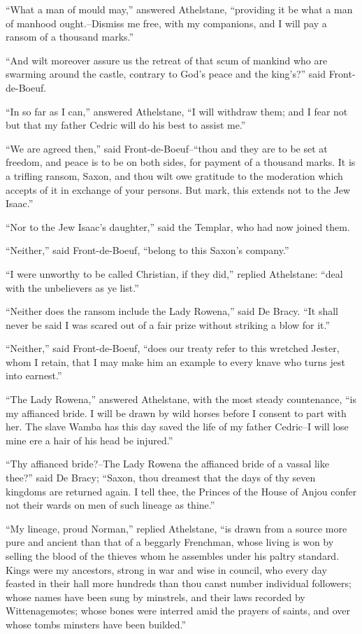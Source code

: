 ``What a man of mould may,'' answered Athelstane, ``providing it be what
a man of manhood ought.--Dismiss me free, with my companions, and I will
pay a ransom of a thousand marks.''

``And wilt moreover assure us the retreat of that scum of mankind who
are swarming around the castle, contrary to God's peace and the
king's?'' said Front-de-Boeuf.

``In so far as I can,'' answered Athelstane, ``I will withdraw them; and
I fear not but that my father Cedric will do his best to assist me.''

``We are agreed then,'' said Front-de-Boeuf--``thou and they are to be
set at freedom, and peace is to be on both sides, for payment of a
thousand marks. It is a trifling ransom, Saxon, and thou wilt owe
gratitude to the moderation which accepts of it in exchange of your
persons. But mark, this extends not to the Jew Isaac.''

``Nor to the Jew Isaac's daughter,'' said the Templar, who had now
joined them.

``Neither,'' said Front-de-Boeuf, ``belong to this Saxon's company.''

``I were unworthy to be called Christian, if they did,'' replied
Athelstane: ``deal with the unbelievers as ye list.''

``Neither does the ransom include the Lady Rowena,'' said De Bracy. ``It
shall never be said I was scared out of a fair prize without striking a
blow for it.''

``Neither,'' said Front-de-Boeuf, ``does our treaty refer to this
wretched Jester, whom I retain, that I may make him an example to every
knave who turns jest into earnest.''

``The Lady Rowena,'' answered Athelstane, with the most steady
countenance, ``is my affianced bride. I will be drawn by wild horses
before I consent to part with her. The slave Wamba has this day saved
the life of my father Cedric--I will lose mine ere a hair of his head be
injured.''

``Thy affianced bride?--The Lady Rowena the affianced bride of a vassal
like thee?'' said De Bracy; ``Saxon, thou dreamest that the days of thy
seven kingdoms are returned again. I tell thee, the Princes of the House
of Anjou confer not their wards on men of such lineage as thine.''

``My lineage, proud Norman,'' replied Athelstane, ``is drawn from a
source more pure and ancient than that of a beggarly Frenchman, whose
living is won by selling the blood of the thieves whom he assembles
under his paltry standard. Kings were my ancestors, strong in war and
wise in council, who every day feasted in their hall more hundreds than
thou canst number individual followers; whose names have been sung by
minstrels, and their laws recorded by Wittenagemotes; whose bones were
interred amid the prayers of saints, and over whose tombs minsters have
been builded.''

